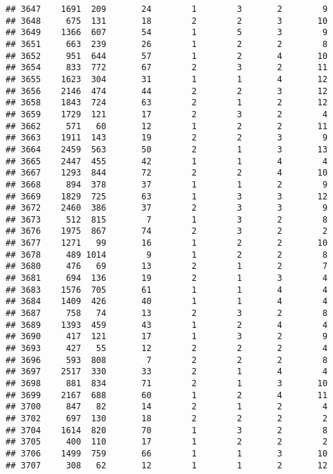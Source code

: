 \documentclass[]{article}
\begin{document}
\begin{verbatim}
## 3647    1691  209       24        1        3       2        9
## 3648     675  131       18        2        2       3       10
## 3649    1366  607       54        1        5       3        9
## 3651     663  239       26        1        2       2        8
## 3652     951  644       57        1        2       4       10
## 3654     833  772       67        2        3       2       11
## 3655    1623  304       31        1        1       4       12
## 3656    2146  474       44        2        2       3       12
## 3658    1843  724       63        2        1       2       12
## 3659    1729  121       17        2        3       2        4
## 3662     571   60       12        1        2       2       11
## 3663    1911  143       19        2        2       3        9
## 3664    2459  563       50        2        1       3       13
## 3665    2447  455       42        1        1       4        4
## 3667    1293  844       72        2        2       4       10
## 3668     894  378       37        1        1       2        9
## 3669    1829  725       63        1        3       3       12
## 3672    2460  386       37        2        3       3        9
## 3673     512  815        7        1        3       2        8
## 3676    1975  867       74        2        3       2        2
## 3677    1271   99       16        1        2       2       10
## 3678     489 1014        9        1        2       2        8
## 3680     476   69       13        2        1       2        7
## 3681     694  136       19        2        1       3        4
## 3683    1576  705       61        1        1       4        4
## 3684    1409  426       40        1        1       4        4
## 3687     758   74       13        2        3       2        8
## 3689    1393  459       43        1        2       4        4
## 3690     417  121       17        1        3       2        9
## 3693     427   55       12        2        2       2        4
## 3696     593  808        7        2        2       2        8
## 3697    2517  330       33        2        1       4        4
## 3698     881  834       71        2        1       3       10
## 3699    2167  688       60        1        2       4       11
## 3700     847   82       14        2        1       2        4
## 3702     697  130       18        2        2       2        2
## 3704    1614  820       70        1        3       2        8
## 3705     400  110       17        1        2       2        2
## 3706    1499  759       66        1        1       3       10
## 3707     308   62       12        1        1       2       12

\end{verbatim}
\end{document}
